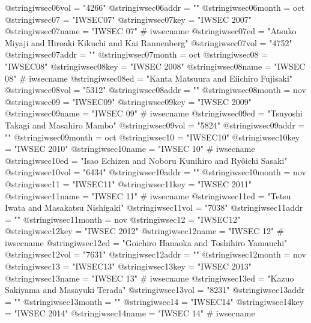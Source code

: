 @string{iwsec06vol =            "4266"}
@string{iwsec06addr =           ""}
@string{iwsec06month =          oct}
@string{iwsec07 =               "IWSEC07"}
@string{iwsec07key =            "IWSEC 2007"}
@string{iwsec07name =           "IWSEC 07" # iwsecname}
@string{iwsec07ed =             "Atsuko Miyaji and Hiroaki Kikuchi and Kai Rannenberg"}
@string{iwsec07vol =            "4752"}
@string{iwsec07addr =           ""}
@string{iwsec07month =          oct}
@string{iwsec08 =               "IWSEC08"}
@string{iwsec08key =            "IWSEC 2008"}
@string{iwsec08name =           "IWSEC 08" # iwsecname}
@string{iwsec08ed =             "Kanta Matsuura and Eiichiro Fujisaki"}
@string{iwsec08vol =            "5312"}
@string{iwsec08addr =           ""}
@string{iwsec08month =          nov}
@string{iwsec09 =               "IWSEC09"}
@string{iwsec09key =            "IWSEC 2009"}
@string{iwsec09name =           "IWSEC 09" # iwsecname}
@string{iwsec09ed =             "Tsuyoshi Takagi and Masahiro Mambo"}
@string{iwsec09vol =            "5824"}
@string{iwsec09addr =           ""}
@string{iwsec09month =          oct}
@string{iwsec10 =               "IWSEC10"}
@string{iwsec10key =            "IWSEC 2010"}
@string{iwsec10name =           "IWSEC 10" # iwsecname}
@string{iwsec10ed =             "Isao Echizen and Noboru Kunihiro and Ry{\^o}ichi Sasaki"}
@string{iwsec10vol =            "6434"}
@string{iwsec10addr =           ""}
@string{iwsec10month =          nov}
@string{iwsec11 =               "IWSEC11"}
@string{iwsec11key =            "IWSEC 2011"}
@string{iwsec11name =           "IWSEC 11" # iwsecname}
@string{iwsec11ed =             "Tetsu Iwata and Masakatsu Nishigaki"}
@string{iwsec11vol =            "7038"}
@string{iwsec11addr =           ""}
@string{iwsec11month =          nov}
@string{iwsec12 =               "IWSEC12"}
@string{iwsec12key =            "IWSEC 2012"}
@string{iwsec12name =           "IWSEC 12" # iwsecname}
@string{iwsec12ed =             "Goichiro Hanaoka and Toshihiro Yamauchi"}
@string{iwsec12vol =            "7631"}
@string{iwsec12addr =           ""}
@string{iwsec12month =          nov}
@string{iwsec13 =               "IWSEC13"}
@string{iwsec13key =            "IWSEC 2013"}
@string{iwsec13name =           "IWSEC 13" # iwsecname}
@string{iwsec13ed =             "Kazuo Sakiyama and Masayuki Terada"}
@string{iwsec13vol =            "8231"}
@string{iwsec13addr =           ""}
@string{iwsec13month =          ""}
@string{iwsec14 =               "IWSEC14"}
@string{iwsec14key =            "IWSEC 2014"}
@string{iwsec14name =           "IWSEC 14" # iwsecname}
